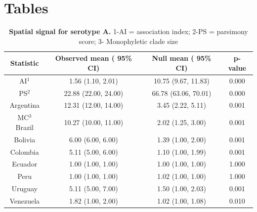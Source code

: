 \documentclass[10pt]{article}
\begin{document}
\section*{Tables}
\begin{table}[!ht]
\caption{
\textbf{Spatial signal for serotype A.} 1-AI = association index; 2-PS = parsimony score; 3- Monophyletic clade size}
\begin{tabular}{cccc}
\toprule
Statistic &	Observed mean ( 95\% CI)&	Null mean ( 95\% CI)&	p-value\\
\midrule
AI$^1$	&1.56 (1.10, 2.01)& 10.75 (9.67, 11.83) &0.000\\
PS$^2$	&22.88 (22.00, 24.00)	&66.78	(63.06, 70.01)	&0.000\\
Argentina &12.31 (12.00, 14.00)	&3.45	(2.22, 5.11)	&0.001\\
MC$^3$ Brazil &10.27	(10.00, 11.00)	&2.02 (1.25, 3.00) &0.001\\
Bolivia &6.00 (6.00, 6.00)	&1.39 (1.00, 2.00)	&0.001\\
Colombia &5.11 (5.00, 6.00)	&1.10  (1.00, 1.99)	&0.001\\
Ecuador &1.00 (1.00, 1.00)	&1.00 (1.00, 1.00)	&1.000\\
Peru&1.00 (1.00, 1.00)	&1.02 (1.00, 1.00)	&1.000\\
Uruguay &5.11 (5.00, 7.00)	&1.50	(1.00, 2.03)	&0.001\\
Venezuela&1.82 (1.00, 2.00)	&1.02 (1.00, 1.08)	&0.010\\
\bottomrule
\end{tabular}
\begin{flushleft}
\end{flushleft}
\label{tab:BaTSA}
 \end{table}
\end{document}
